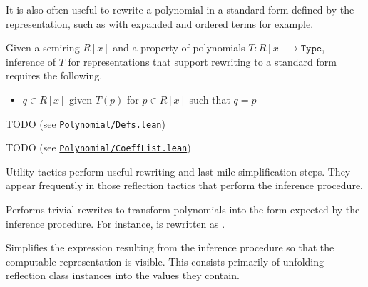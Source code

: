 It is also often useful to rewrite a polynomial in a standard form defined by the representation, such as with expanded and ordered terms for example.

\begin{definition}
\label{def:FormReflection}
\leanok
Given a semiring $R[x]$ and a property of polynomials $T:R[x] \to \mathtt{Type}$, inference of $T$ for representations that support rewriting to a standard form requires the following.
\begin{itemize}
\item $q \in R[x]$ given $T(p)$ for $p \in R[x]$ such that $q = p$
\end{itemize}
\end{definition}


TODO (see \href{https://github.com/LiamSchilling/AutomatePolynomial/blob/master/AutomatePolynomial/Reflection/Polynomial/Defs.lean}{\texttt{Polynomial/Defs.lean}})


TODO (see \href{https://github.com/LiamSchilling/AutomatePolynomial/blob/master/AutomatePolynomial/Representation/Polynomial/CoeffList.lean}{\texttt{Polynomial/CoeffList.lean}})

\label{sec:tactics}


Utility tactics perform useful rewriting and last-mile simplification steps. They appear frequently in those reflection tactics that perform the inference procedure.

\begin{tactic}
\label{tac:poly_rfl_rw}
\leanok
Performs trivial rewrites to transform polynomials into the form expected by the inference procedure. For instance,  is rewritten as .
\end{tactic}

\begin{tactic}
\label{tac:poly_rfl_dsimp}
\leanok
{}
Simplifies the expression resulting from the inference procedure so that the computable representation is visible. This consists primarily of unfolding reflection class instances into the values they contain.
\end{tactic}

